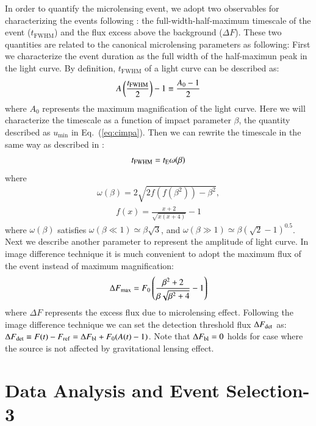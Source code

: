 \documentclass[iop, apj]{emulateapj}
\newcommand{\?}{\stackrel{?}{=}}
\begin{document}
In order to quantify the microlensing event, we adopt two observables for characterizing the events following \citet{Riffeseretal:06}: the full-width-half-maximum timescale of the event ($t_\mathrm{FWHM}$) and the flux excess above the background ($\Delta F$). These two quantities are related to the canonical microlensing parameters as following: 
%
First we characterize the event duration as the full width of the half-maximun peak in the light curve. 
By definition, $t_\mathrm{FWHM}$ of a light curve can be described as: 
%
\begin{eqnarray}
A\left(\frac{t_{\rm FWHM}}{2}\right)-1\equiv\frac{A_0-1}{2}
\end{eqnarray}
%
where $A_0$ represents the maximum magnification of the light curve. Here we will characterize the timescale as a function of impact parameter $\beta$, the quantity described as $u_\mathrm{min}$ in Eq.~(\ref{eq:cimpa}). Then we can rewrite the timescale in the same way as described in \citet{Gondolo:99}: 
%
\begin{eqnarray}
t_{\rm FWHM}=t_{\rm E}\omega(\beta)
\end{eqnarray}
%
where 
%
\begin{eqnarray}
\omega(\beta)=2\sqrt{2f(f(\beta^2))-\beta^2},
\end{eqnarray}
%
\begin{eqnarray}
f(x)=\frac{x+2}{\sqrt{x(x+4)}}-1
\end{eqnarray}
%
where $\omega(\beta)$ satisfies $\omega(\beta\ll1)\simeq \beta\sqrt{3}$, and $\omega(\beta\gg1)\simeq\beta(\sqrt{2}-1)^{0.5}$. 
Next we describe another parameter to represent the amplitude of light curve. In image difference technique it is much convenient to adopt the maximum flux of the event instead of maximum magnification: 
%
\begin{eqnarray}
\Delta F_{\rm max}=F_0\left(\frac{\beta^2+2}{\beta\sqrt{\beta^2+4}}-1\right)
\label{eq:diffmicro}
\end{eqnarray}
%
where $\Delta F$ represents the excess flux due to microlensing effect. Following the image difference technique we can set the detection threshold flux $\Delta F_{\rm det}$ as: 
$\Delta F_{\rm det}\equiv F(t)-F_{\rm ref}=\Delta F_{\rm bl}+F_0(A(t)-1)$. 
Note that $\Delta F_{\rm bl}=0$ holds for case where the source is not affected by gravitational lensing effect. 




\section{Data Analysis and Event Selection-3}
\label{sec:obs2}
\end{document}
